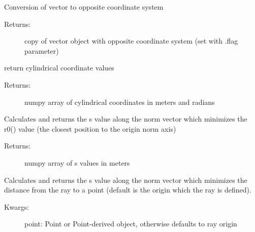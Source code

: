 \documentclass[letterpaper,10pt,english]{sphinxmanual}
\begin{document}
\begin{fulllineitems}
\begin{description}
\end{description}

\begin{fulllineitems}
\label{TRIPPy:TRIPPy.beam.Beam.c}
Conversion of vector to opposite coordinate system
\begin{description}
\item[{Returns:}] \leavevmode
copy of vector object with opposite coordinate system
(set with .flag parameter)

\end{description}

\end{fulllineitems}


\begin{fulllineitems}
\label{TRIPPy:TRIPPy.beam.Beam.r}
return cylindrical coordinate values
\begin{description}
\item[{Returns:}] \leavevmode
numpy array of cylindrical coordinates in meters and radians

\end{description}

\end{fulllineitems}


\begin{fulllineitems}
\label{TRIPPy:TRIPPy.beam.Beam.rmin}
Calculates and returns the s value along the norm vector
which minimizes the r0() value (the closest position to the
origin norm axis)
\begin{description}
\item[{Returns:}] \leavevmode
numpy array of s values in meters

\end{description}

\end{fulllineitems}


\begin{fulllineitems}
\label{TRIPPy:TRIPPy.beam.Beam.smin}
Calculates and returns the s value along the norm vector
which minimizes the distance from the ray to a point 
(default is the origin which the ray is defined).
\begin{description}
\item[{Kwargs:}] \leavevmode
point: Point or Point-derived object, otherwise defaults to ray 
origin


\end{description}
\end{fulllineitems}
\end{fulllineitems}
\end{document}
